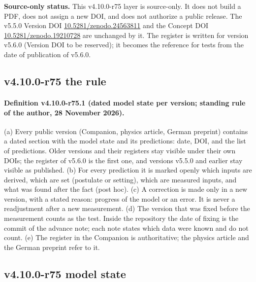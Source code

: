 \noindent\textbf{Source-only status.}
This v4.10.0-r75 layer is source-only.  It does not build a PDF, does not assign a new DOI,
and does not authorize a public release.  The v5.5.0 Version DOI
\href{https://doi.org/10.5281/zenodo.24563811}{10.5281/zenodo.24563811} and the Concept DOI
\href{https://doi.org/10.5281/zenodo.19210728}{10.5281/zenodo.19210728} are unchanged by it.  The register is written for version v5.6.0
(Version DOI to be reserved); it becomes the reference for tests from the date of publication of v5.6.0.

\subsection*{v4.10.0-r75 the rule}
\label{subsec:v4100-r75-rule}

\paragraph{Definition v4.10.0-r75.1 (dated model state per version; standing rule of the author, 28 November 2026).}
(a) Every public version (Companion, physics article, German preprint) contains a dated section with the model state and its predictions:
date, DOI, and the list of predictions.  Older versions and their registers stay visible under their own DOIs; the register of v5.6.0 is the
first one, and versions v5.5.0 and earlier stay visible as published.
(b) For every prediction it is marked openly which inputs are derived, which are set (postulate or setting), which are measured inputs, and
what was found after the fact (post hoc).
(c) A correction is made only in a new version, with a stated reason: progress of the model or an error.  It is never a readjustment after a
new measurement.
(d) The version that was fixed before the measurement counts as the test.  Inside the repository the date of fixing is the commit of the
advance note; each note states which data were known and do not count.
(e) The register in the Companion is authoritative; the physics article and the German preprint refer to it.

\subsection*{v4.10.0-r75 model state}
\label{subsec:v4100-r75-model-state}

